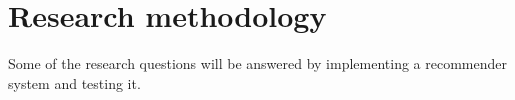 


\section{Research methodology}
Some of the research questions will be answered by implementing a recommender system and testing it.


